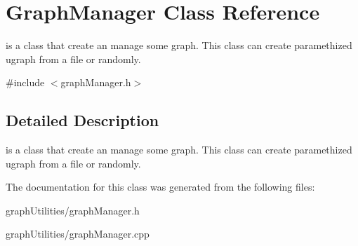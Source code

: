 \hypertarget{classGraphManager}{\section{Graph\-Manager Class Reference}
\label{classGraphManager}
}


is a class that create an manage some graph. This class can create paramethized ugraph from a file or randomly.  




{\ttfamily \#include $<$graph\-Manager.\-h$>$}



\subsection{Detailed Description}
is a class that create an manage some graph. This class can create paramethized ugraph from a file or randomly. 

The documentation for this class was generated from the following files\-:\begin{DoxyCompactItemize}
\item 
graph\-Utilities/graph\-Manager.\-h\item 
graph\-Utilities/graph\-Manager.\-cpp\end{DoxyCompactItemize}

